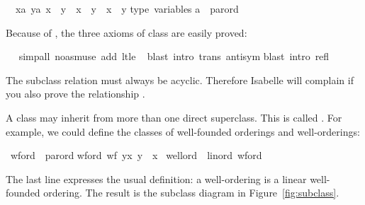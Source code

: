 \begin{isabellebody}
\begin{isamarkuptxt}
\begin{isabelle}
\ {}{\isachardot}\ {\isasymAnd}{\isacharparenleft}x{\isasymColon}{\isacharprime}a{\isacharparenright}\ y{\isasymColon}{\isacharprime}a{\isachardot}\ {\isacharparenleft}x\ {\isacharless}{\isacharless}{\isacharequal}\ y{\isacharparenright}\ {\isacharequal}\ {\isacharparenleft}x\ {\isacharless}{\isacharless}\ y\ {\isasymor}\ x\ {\isacharequal}\ y{\isacharparenright}\isanewline
type\ variables{\isacharcolon}\isanewline
\isaindent{\ \ }{\isacharprime}a\ {\isacharcolon}{\isacharcolon}\ parord%
\end{isabelle}
Because of , the three axioms of class 
are easily proved:%
\end{isamarkuptxt}%
\isamarkuptrue%
\ \ \isamarkupfalse%
{\isacharparenleft}simp{\isacharunderscore}all\ {\isacharparenleft}no{\isacharunderscore}asm{\isacharunderscore}use{\isacharparenright}\ add{\isacharcolon}\ lt{\isacharunderscore}le{\isacharparenright}\isanewline
\ \isamarkupfalse%
{\isacharparenleft}blast\ intro{\isacharcolon}\ trans\ antisym{\isacharparenright}\isanewline
{}\isamarkupfalse%
{\isacharparenleft}blast\ intro{\isacharcolon}\ refl{\isacharparenright}\isanewline
{}\isamarkupfalse%
%
\endisatagproof
{\isafoldproof}%
%
\isadelimproof
%
\endisadelimproof
%
\begin{isamarkuptext}%
The subclass relation must always be acyclic. Therefore Isabelle will
complain if you also prove the relationship .%
\end{isamarkuptext}%
\isamarkuptrue%
%
\isamarkuptrue%
%
\begin{isamarkuptext}%
A class may inherit from more than one direct superclass. This is called
.  For example, we could define
the classes of well-founded orderings and well-orderings:%
\end{isamarkuptext}%
\isamarkuptrue%
\isamarkupfalse%
\ wford\ {\isacharless}\ parord\isanewline
wford{\isacharcolon}\ {\isachardoublequoteopen}wf\ {\isacharbraceleft}{\isacharparenleft}y{\isacharcomma}x{\isacharparenright}{\isachardot}\ y\ {\isacharless}{\isacharless}\ x{\isacharbraceright}{\isachardoublequoteclose}\isanewline
\isanewline
{}\isamarkupfalse%
\ wellord\ {\isacharless}\ linord{\isacharcomma}\ wford%
\begin{isamarkuptext}%
\noindent
The last line expresses the usual definition: a well-ordering is a linear
well-founded ordering. The result is the subclass diagram in
Figure~\ref{fig:subclass}.


\end{isamarkuptext}
\end{isabellebody}
